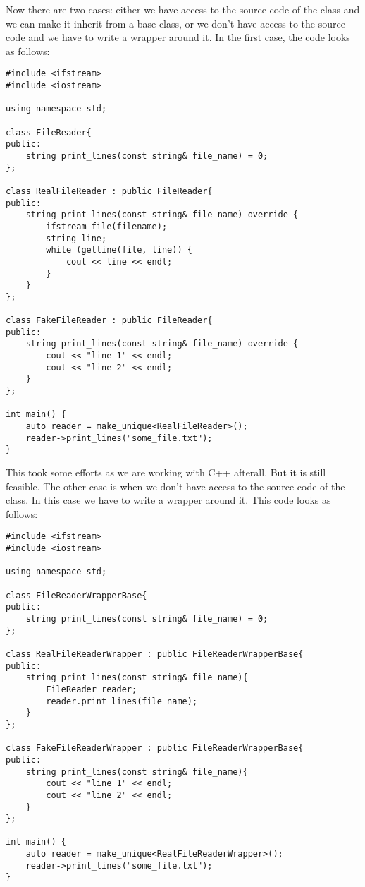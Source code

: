 Now there are two cases: either we have access to the source code of the  class and we can make it inherit from a base class, or we don't have access to the source code and we have to write a wrapper around it. In the first case, the code looks as follows:


\begin{programcode}{}
\begin{verbatim}
#include <ifstream>
#include <iostream>

using namespace std; 

class FileReader{
public:
    string print_lines(const string& file_name) = 0;
};

class RealFileReader : public FileReader{
public:
    string print_lines(const string& file_name) override {
        ifstream file(filename);
        string line;
        while (getline(file, line)) {
            cout << line << endl;
        }
    }
};

class FakeFileReader : public FileReader{
public:
    string print_lines(const string& file_name) override {
        cout << "line 1" << endl;
        cout << "line 2" << endl;
    }
};

int main() {
    auto reader = make_unique<RealFileReader>();
    reader->print_lines("some_file.txt");
}
\end{verbatim}
\end{programcode}

This took some efforts as we are working with C++ afterall. But it is still feasible. The other case is when we don't have access to the source code of the  class. In this case we have to write a wrapper around it. This code looks as follows:

\begin{programcode}{}
\begin{verbatim}
#include <ifstream>
#include <iostream>

using namespace std;

class FileReaderWrapperBase{
public:
    string print_lines(const string& file_name) = 0;
};

class RealFileReaderWrapper : public FileReaderWrapperBase{
public:
    string print_lines(const string& file_name){
        FileReader reader;
        reader.print_lines(file_name);
    }
};

class FakeFileReaderWrapper : public FileReaderWrapperBase{
public:
    string print_lines(const string& file_name){
        cout << "line 1" << endl;
        cout << "line 2" << endl;
    }
};

int main() {
    auto reader = make_unique<RealFileReaderWrapper>();
    reader->print_lines("some_file.txt");
}
\end{verbatim}
\end{programcode}

